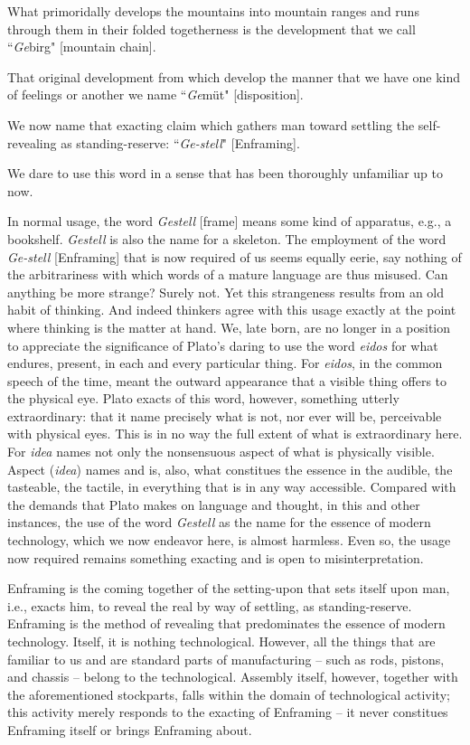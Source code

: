 \documentclass[12pt]{article}
\begin{document}
What primoridally develops the mountains into mountain ranges and runs through them in their folded togetherness is the development that we call ``\textit{Ge}birg" [mountain chain].

That original development from which develop the manner that we have one kind of feelings or another we name ``\textit{Ge}m{\"u}t" [disposition].

We now name that exacting claim which gathers man toward settling the self-revealing as standing-reserve: ``\textit{Ge-stell}" [Enframing].

We dare to use this word in a sense that has been thoroughly unfamiliar up to now.

In normal usage, the word \textit{Gestell} [frame] means some kind of apparatus, e.g., a bookshelf. \textit{Gestell} is also the name for a skeleton. The employment of the word \textit{Ge-stell} [Enframing] that is now required of us seems equally eerie, say nothing of the arbitrariness with which words of a mature language are thus misused. Can anything be more strange? Surely not. Yet this strangeness results from an old habit of thinking. And indeed thinkers agree with this usage exactly at the point where thinking is the matter at hand.  We, late born, are no longer in a position to appreciate the significance of Plato's daring to use the word \textit{eidos} for what endures, present, in each and every particular thing. For \textit{eidos}, in the common speech of the time, meant the outward appearance that a visible thing offers to the physical eye. Plato exacts of this word, however, something utterly extraordinary: that it name precisely what is not, nor ever will be, perceivable with physical eyes. This is in no way the full extent of what is extraordinary here. For \textit{idea} names not only the nonsensuous aspect of what is physically visible. Aspect (\textit{idea}) names and is, also, what constitues the essence in the audible, the tasteable, the tactile, in everything that is in any way accessible. Compared with the demands that Plato makes on language and thought, in this and other instances, the use of the word \textit{Gestell} as the name for the essence of modern technology, which we now endeavor here, is almost harmless. Even so, the usage now required remains something exacting and is open to misinterpretation.

Enframing is the coming together of the setting-upon that sets itself upon man, i.e., exacts him, to reveal the real by way of settling, as standing-reserve. Enframing is the method of revealing that predominates the essence of modern technology. Itself, it is nothing technological. However, all the things that are familiar to us and are standard parts of manufacturing -- such as rods, pistons, and chassis -- belong to the technological. Assembly itself, however, together with the aforementioned stockparts, falls within the domain of technological activity; this activity merely responds to the exacting of Enframing -- it never constitues Enframing itself or brings Enframing about.
\end{document}
